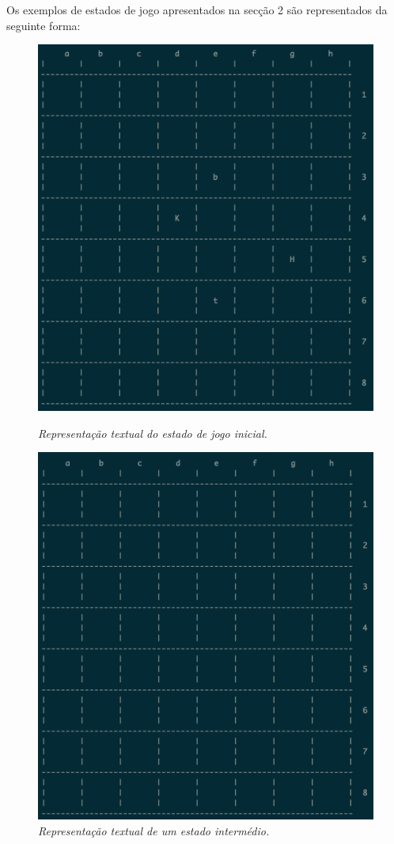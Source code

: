 \documentclass[a4paper]{article}
\begin{document}
Os exemplos de estados de jogo apresentados na secção 2 são representados da seguinte forma:

\begin{small}
\begin{figure}[!htb]
\includegraphics[scale=0.4]{board-texto-1.png}
\caption{\textit{ Representação textual do estado de jogo inicial.}}
\label{fig:fig5}
\endminipage\hfill
{}
\includegraphics[scale=0.4]{board-texto-2.png}
\caption{\textit{ Representação textual de um estado intermédio.}}
\label{fig:fig6}
\endminipage
\end{figure}
\end{small}
\end{document}
